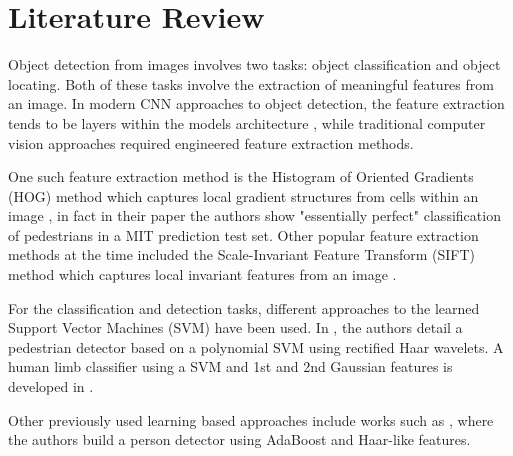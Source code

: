 \section{Literature Review}

Object detection from images involves two tasks: object classification and object locating. 
Both of these tasks involve the extraction of meaningful features from an image. 
In modern CNN approaches to object detection, the feature extraction tends to be layers within the models architecture \cite{reddi2024mlsystems}, while traditional computer vision approaches required engineered feature extraction methods.

One such feature extraction method is the Histogram of Oriented Gradients (HOG) method which captures local gradient structures from cells within an image \cite{HOGpaper}, in fact in their paper the authors show "essentially perfect" classification of pedestrians in a MIT prediction test set.
Other popular feature extraction methods at the time included the Scale-Invariant Feature Transform (SIFT) method which captures local invariant features from an image \cite{lowe2004distinctive}.

For the classification and detection tasks, different approaches to the learned Support Vector Machines (SVM) have been used.
In \cite{papageorgiou2000trainable}, the authors detail a pedestrian detector based on a polynomial SVM using rectified Haar wavelets.
A human limb classifier using a SVM and 1st and 2nd Gaussian features is developed in \cite{ronfard2002learning}.

Other previously used learning based approaches include works such as \cite{1238422}, where the authors build a person detector using AdaBoost and Haar-like features.